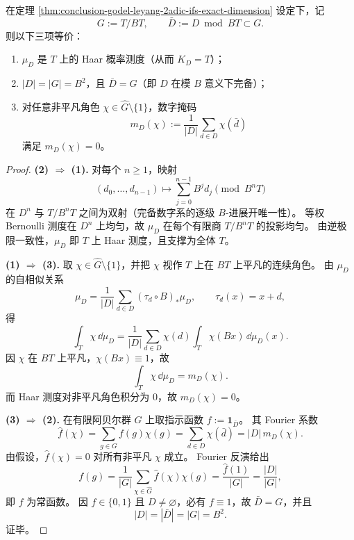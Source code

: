 \begin{theorem}\label{thm:conclusion-godel-leyang-haar-complete-digit}
在定理 \ref{thm:conclusion-godel-leyang-2adic-ifs-exact-dimension} 设定下，记
\[
G:=T/BT,\qquad \bar D:=D\bmod BT\subset G.
\]
则以下三项等价：
\begin{enumerate}
  \item \(\mu_D\) 是 \(T\) 上的 Haar 概率测度（从而 \(K_D=T\)）；
  \item \(|D|=|G|=B^2\)，且 \(\bar D=G\)（即 \(D\) 在模 \(B\) 意义下完备）；
  \item 对任意非平凡角色 \(\chi\in\widehat G\setminus\{1\}\)，数字掩码
  \begin{equation}\label{eq:conclusion-godel-leyang-mask}
  m_D(\chi):=\frac{1}{|D|}\sum_{d\in D}\chi(\bar d)
  \end{equation}
  满足 \(m_D(\chi)=0\)。
\end{enumerate}
\end{theorem}
\begin{proof}
\textbf{(2) \(\Rightarrow\) (1).}
对每个 \(n\ge 1\)，映射
\[
(d_0,\dots,d_{n-1})\longmapsto
\sum_{j=0}^{n-1}B^j d_j \pmod{B^nT}
\]
在 \(D^n\) 与 \(T/B^nT\) 之间为双射（完备数字系的逐级 \(B\)-进展开唯一性）。
等权 Bernoulli 测度在 \(D^n\) 上均匀，故 \(\mu_D\) 在每个有限商 \(T/B^nT\) 的投影均匀。
由逆极限一致性，\(\mu_D\) 即 \(T\) 上 Haar 测度，且支撑为全体 \(T\)。

\textbf{(1) \(\Rightarrow\) (3).}
取 \(\chi\in\widehat G\setminus\{1\}\)，并把 \(\chi\) 视作 \(T\) 上在 \(BT\) 上平凡的连续角色。
由 \(\mu_D\) 的自相似关系
\[
\mu_D=\frac1{|D|}\sum_{d\in D}(\tau_d\circ B)_*\mu_D,\qquad \tau_d(x)=x+d,
\]
得
\[
\int_T\chi\,\dd\mu_D
=\frac1{|D|}\sum_{d\in D}\chi(d)\int_T\chi(Bx)\,\dd\mu_D(x).
\]
因 \(\chi\) 在 \(BT\) 上平凡，\(\chi(Bx)\equiv 1\)，故
\[
\int_T\chi\,\dd\mu_D=m_D(\chi).
\]
而 Haar 测度对非平凡角色积分为 \(0\)，故 \(m_D(\chi)=0\)。

\textbf{(3) \(\Rightarrow\) (2).}
在有限阿贝尔群 \(G\) 上取指示函数 \(f:=\mathbf 1_{\bar D}\)。
其 Fourier 系数
\[
\widehat f(\chi)=\sum_{g\in G}f(g)\chi(g)=\sum_{d\in D}\chi(\bar d)=|D|\,m_D(\chi).
\]
由假设，\(\widehat f(\chi)=0\) 对所有非平凡 \(\chi\) 成立。
Fourier 反演给出
\[
f(g)=\frac1{|G|}\sum_{\chi\in\widehat G}\widehat f(\chi)\chi(g)
=\frac{\widehat f(1)}{|G|}
=\frac{|D|}{|G|},
\]
即 \(f\) 为常函数。
因 \(f\in\{0,1\}\) 且 \(D\neq\varnothing\)，必有 \(f\equiv 1\)，故 \(\bar D=G\)，并且
\[
|D|=|\bar D|=|G|=B^2.
\]
证毕。
\end{proof}

